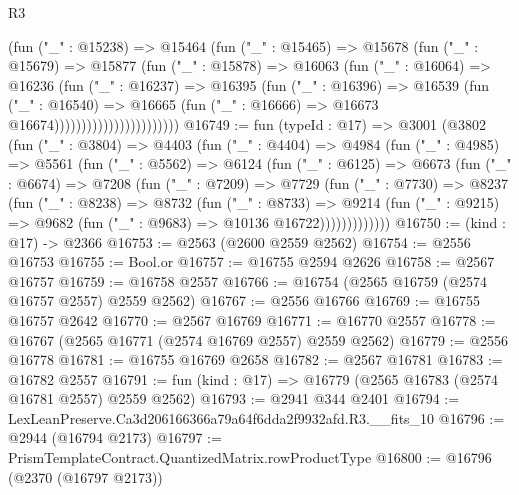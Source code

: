 \begin{lexlean}{R3}
\begin{coremodule}
                                (fun ("_" : @15238) =>
                                @15464
                                  (fun ("_" : @15465) =>
                                  @15678
                                    (fun ("_" : @15679) =>
                                    @15877
                                      (fun ("_" : @15878) =>
                                      @16063
                                        (fun ("_" : @16064) =>
                                        @16236
                                          (fun ("_" : @16237) =>
                                          @16395
                                            (fun ("_" : @16396) =>
                                            @16539
                                              (fun ("_" : @16540) =>
                                              @16665
                                                (fun ("_" : @16666) =>
                                                @16673 @16674)))))))))))))))))))))))
@16749 := fun (typeId : @17) =>
  @3001
    (@3802
      (fun ("_" : @3804) =>
      @4403
        (fun ("_" : @4404) =>
        @4984
          (fun ("_" : @4985) =>
          @5561
            (fun ("_" : @5562) =>
            @6124
              (fun ("_" : @6125) =>
              @6673
                (fun ("_" : @6674) =>
                @7208
                  (fun ("_" : @7209) =>
                  @7729
                    (fun ("_" : @7730) =>
                    @8237
                      (fun ("_" : @8238) =>
                      @8732
                        (fun ("_" : @8733) =>
                        @9214
                          (fun ("_" : @9215) =>
                          @9682 (fun ("_" : @9683) => @10136 @16722)))))))))))))
@16750 := (kind : @17) -> @2366
@16753 := @2563 (@2600 @2559 @2562)
@16754 := @2556 @16753
@16755 := Bool.or
@16757 := @16755 @2594 @2626
@16758 := @2567 @16757
@16759 := @16758 @2557
@16766 := @16754 (@2565 @16759 (@2574 @16757 @2557) @2559 @2562)
@16767 := @2556 @16766
@16769 := @16755 @16757 @2642
@16770 := @2567 @16769
@16771 := @16770 @2557
@16778 := @16767 (@2565 @16771 (@2574 @16769 @2557) @2559 @2562)
@16779 := @2556 @16778
@16781 := @16755 @16769 @2658
@16782 := @2567 @16781
@16783 := @16782 @2557
@16791 := fun (kind : @17) => @16779 (@2565 @16783 (@2574 @16781 @2557) @2559 @2562)
@16793 := @2941 @344 @2401
@16794 := LexLeanPreserve.Ca3d206166366a79a64f6dda2f9932afd.R3.__fits_10
@16796 := @2944 (@16794 @2173)
@16797 := PrismTemplateContract.QuantizedMatrix.rowProductType
@16800 := @16796 (@2370 (@16797 @2173))

\end{coremodule}
\end{lexlean}
